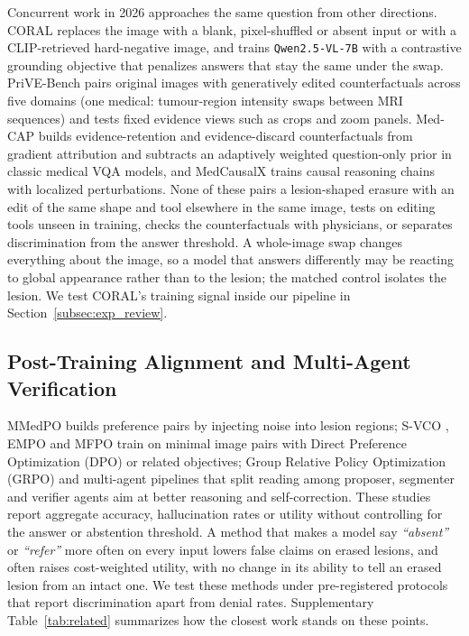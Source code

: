 \documentclass[journal]{IEEEtran}
\begin{document}
Concurrent work in 2026 approaches the same question from other directions. CORAL \citep{zafar2026coral} replaces the image with a blank, pixel-shuffled or absent input or with a CLIP-retrieved hard-negative image, and trains \texttt{Qwen2.5-VL-7B} with a contrastive grounding objective that penalizes answers that stay the same under the swap. PriVE-Bench \citep{sun2026prive} pairs original images with generatively edited counterfactuals across five domains (one medical: tumour-region intensity swaps between MRI sequences) and tests fixed evidence views such as crops and zoom panels. Med-CAP \citep{huang2026medcap} builds evidence-retention and evidence-discard counterfactuals from gradient attribution and subtracts an adaptively weighted question-only prior in classic medical VQA models, and MedCausalX \citep{lin2026medcausalx} trains causal reasoning chains with localized perturbations. None of these pairs a lesion-shaped erasure with an edit of the same shape and tool elsewhere in the same image, tests on editing tools unseen in training, checks the counterfactuals with physicians, or separates discrimination from the answer threshold. A whole-image swap changes everything about the image, so a model that answers differently may be reacting to global appearance rather than to the lesion; the matched control isolates the lesion. We test CORAL's training signal inside our pipeline in Section~\ref{subsec:exp_review}.

\subsection{Post-Training Alignment and Multi-Agent Verification}
\label{subsec:rw_alignment}
MMedPO \citep{zhu2024mmedpo} builds preference pairs by injecting noise into lesion regions; S-VCO \citep{svco2024}, EMPO \citep{wu2025empo} and MFPO \citep{jiang2025mfpo} train on minimal image pairs with Direct Preference Optimization (DPO) \citep{rafailov2023dpo} or related objectives; Group Relative Policy Optimization (GRPO) \citep{shao2024deepseekmath} and multi-agent pipelines that split reading among proposer, segmenter and verifier agents aim at better reasoning and self-correction. These studies report aggregate accuracy, hallucination rates or utility without controlling for the answer or abstention threshold. A method that makes a model say \emph{``absent''} or \emph{``refer''} more often on every input lowers false claims on erased lesions, and often raises cost-weighted utility, with no change in its ability to tell an erased lesion from an intact one. We test these methods under pre-registered protocols that report discrimination apart from denial rates. Supplementary Table~\ref{tab:related} summarizes how the closest work stands on these points.
\end{document}
